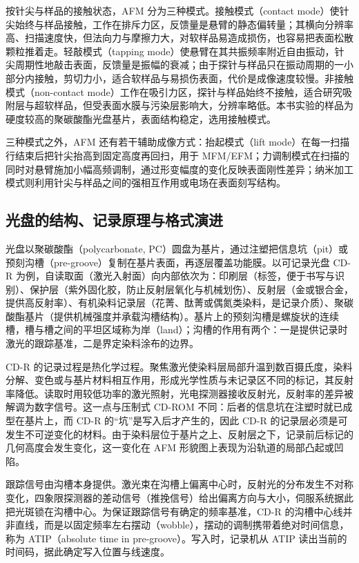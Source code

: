 按针尖与样品的接触状态，AFM 分为三种模式。接触模式（contact mode）使针尖始终与样品接触，工作在排斥力区，反馈量是悬臂的静态偏转量；其横向分辨率高、扫描速度快，但法向力与摩擦力大，对软样品易造成损伤，也容易把表面松散颗粒推着走。轻敲模式（tapping mode）使悬臂在其共振频率附近自由振动，针尖周期性地敲击表面，反馈量是振幅的衰减；由于探针与样品只在振动周期的一小部分内接触，剪切力小，适合软样品与易损伤表面，代价是成像速度较慢。非接触模式（non-contact mode）工作在吸引力区，探针与样品始终不接触，适合研究吸附层与超软样品，但受表面水膜与污染层影响大，分辨率略低。本书实验的样品为硬度较高的聚碳酸酯光盘基片，表面结构稳定，选用接触模式。

三种模式之外，AFM 还有若干辅助成像方式：抬起模式（lift mode）在每一扫描行结束后把针尖抬高到固定高度再回扫，用于 MFM/EFM；力调制模式在扫描的同时对悬臂施加小幅高频调制，通过形变幅度的变化反映表面刚性差异；纳米加工模式则利用针尖与样品之间的强相互作用或电场在表面刻写结构\cite{manual_cspm}。

\subsection{光盘的结构、记录原理与格式演进}

光盘以聚碳酸酯（polycarbonate, PC）圆盘为基片，通过注塑把信息坑（pit）或预刻沟槽（pre-groove）复制在基片表面，再逐层覆盖功能膜。以可记录光盘 CD-R 为例，自读取面（激光入射面）向内部依次为：印刷层（标签，便于书写与识别）、保护层（紫外固化胶，防止反射层氧化与机械划伤）、反射层（金或银合金，提供高反射率）、有机染料记录层（花菁、酞菁或偶氮类染料，是记录介质）、聚碳酸酯基片（提供机械强度并承载沟槽结构）。基片上的预刻沟槽是螺旋状的连续槽，槽与槽之间的平坦区域称为岸（land）；沟槽的作用有两个：一是提供记录时激光的跟踪基准，二是界定染料涂布的边界。

CD-R 的记录过程是热化学过程。聚焦激光使染料层局部升温到数百摄氏度，染料分解、变色或与基片材料相互作用，形成光学性质与未记录区不同的标记，其反射率降低。读取时用较低功率的激光照射，光电探测器接收反射光，反射率的差异被解调为数字信号。这一点与压制式 CD-ROM 不同：后者的信息坑在注塑时就已成型在基片上，而 CD-R 的“坑”是写入后才产生的，因此 CD-R 的记录层必须是可发生不可逆变化的材料。由于染料层位于基片之上、反射层之下，记录前后标记的几何高度会发生变化，这一变化在 AFM 形貌图上表现为沿轨道的局部凸起或凹陷。

跟踪信号由沟槽本身提供。激光束在沟槽上偏离中心时，反射光的分布发生不对称变化，四象限探测器的差动信号（推挽信号）给出偏离方向与大小，伺服系统据此把光斑锁在沟槽中心。为保证跟踪信号有确定的频率基准，CD-R 的沟槽中心线并非直线，而是以固定频率左右摆动（wobble），摆动的调制携带着绝对时间信息，称为 ATIP（absolute time in pre-groove）。写入时，记录机从 ATIP 读出当前的时间码，据此确定写入位置与线速度。

